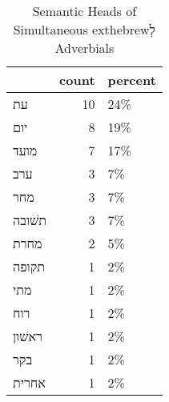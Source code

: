 \begin{table}[htbp!]
\centering
\caption{Semantic Heads of Simultaneous 	exthebrew{לְ} Adverbials}
\label{table:siml_head_cp}
\begin{tabular}{lrl}
\toprule
{} &  count & percent \\
\midrule
עת     &     10 &     24\% \\
יום    &      8 &     19\% \\
מועד   &      7 &     17\% \\
ערב    &      3 &      7\% \\
מחר    &      3 &      7\% \\
תשׁובה &      3 &      7\% \\
מחרת   &      2 &      5\% \\
תקופה  &      1 &      2\% \\
מתי    &      1 &      2\% \\
רוח    &      1 &      2\% \\
ראשׁון &      1 &      2\% \\
בקר    &      1 &      2\% \\
אחרית  &      1 &      2\% \\
\bottomrule
\end{tabular}
\end{table}
